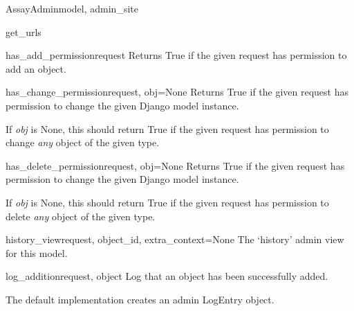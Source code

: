 \documentclass[letterpaper,10pt,english]{sphinxmanual}
\begin{document}
\begin{classdesc}{AssayAdmin}{model, admin\_site}
\hypertarget{data.admin.AssayAdmin.get_urls}{}\begin{methoddesc}{get\_urls}{}\end{methoddesc}

\hypertarget{data.admin.AssayAdmin.has_add_permission}{}\begin{methoddesc}{has\_add\_permission}{request}
Returns True if the given request has permission to add an object.
\end{methoddesc}

\hypertarget{data.admin.AssayAdmin.has_change_permission}{}\begin{methoddesc}{has\_change\_permission}{request, obj=None}
Returns True if the given request has permission to change the given
Django model instance.

If \emph{obj} is None, this should return True if the given request has
permission to change \emph{any} object of the given type.
\end{methoddesc}

\hypertarget{data.admin.AssayAdmin.has_delete_permission}{}\begin{methoddesc}{has\_delete\_permission}{request, obj=None}
Returns True if the given request has permission to change the given
Django model instance.

If \emph{obj} is None, this should return True if the given request has
permission to delete \emph{any} object of the given type.
\end{methoddesc}

\hypertarget{data.admin.AssayAdmin.history_view}{}\begin{methoddesc}{history\_view}{request, object\_id, extra\_context=None}
The `history' admin view for this model.
\end{methoddesc}

\hypertarget{data.admin.AssayAdmin.log_addition}{}\begin{methoddesc}{log\_addition}{request, object}
Log that an object has been successfully added.

The default implementation creates an admin LogEntry object.
\end{methoddesc}


\end{classdesc}
\end{document}
